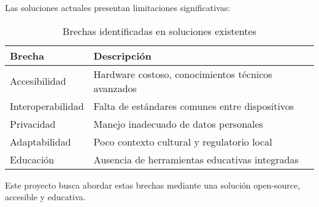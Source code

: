 Las soluciones actuales presentan limitaciones significativas:

\begin{table}[H]
\centering
\caption{Brechas identificadas en soluciones existentes}
\begin{tabular}{|l|l|}
\hline
\textbf{Brecha} & \textbf{Descripción} \\
\hline
Accesibilidad & Hardware costoso, conocimientos técnicos avanzados \\
\hline
Interoperabilidad & Falta de estándares comunes entre dispositivos \\
\hline
Privacidad & Manejo inadecuado de datos personales \\
\hline
Adaptabilidad & Poco contexto cultural y regulatorio local \\
\hline
Educación & Ausencia de herramientas educativas integradas \\
\hline
\end{tabular}
\label{tab:brechas_identificadas}
\end{table}

Este proyecto busca abordar estas brechas mediante una solución open-source, accesible y educativa.


